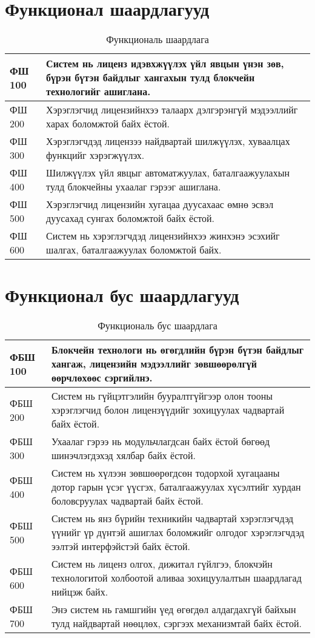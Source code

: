 \section{Функционал шаардлагууд}
\begin{table}[h!]
	\centering
	\begin{tabular}{ |p{2cm}|p{13cm}| }
      \hline
      ФШ 100 & Систем нь лиценз идэвхжүүлэх үйл явцын үнэн зөв, бүрэн бүтэн байдлыг хангахын тулд блокчейн технологийг ашиглана.
      \\ \hline
      ФШ 200 & Хэрэглэгчид  лицензийнхээ талаарх дэлгэрэнгүй мэдээллийг харах боломжтой байх ёстой.
      \\ \hline
      ФШ 300 & Хэрэглэгчдэд лицензээ найдвартай шилжүүлэх, хуваалцах функцийг хэрэгжүүлэх.
      \\ \hline
      ФШ 400 & Шилжүүлэх үйл явцыг автоматжуулах, баталгаажуулахын тулд блокчейны ухаалаг гэрээг ашиглана.
      \\ \hline
      ФШ 500 & Хэрэглэгчид лицензийн хугацаа дуусахаас өмнө эсвэл дуусахад сунгах боломжтой байх ёстой.
      \\ \hline
      ФШ 600 & Систем нь хэрэглэгчдэд лицензийнхээ жинхэнэ эсэхийг шалгах, баталгаажуулах боломжтой байх.
      \\ \hline
	\end{tabular}
   \caption{Функциональ шаардлага}
\end{table}

\newpage
\section{Функционал бус шаардлагууд}
\begin{table}[h!]
	\centering
	\begin{tabular}{ |p{2cm}|p{13cm}| }
		\hline
		ФБШ 100 & Блокчейн технологи нь өгөгдлийн бүрэн бүтэн байдлыг хангаж, лицензийн мэдээллийг зөвшөөрөлгүй өөрчлөхөөс сэргийлнэ.
      \\ \hline
		ФБШ 200 & Систем нь гүйцэтгэлийн бууралтгүйгээр олон тооны хэрэглэгчид болон лицензүүдийг зохицуулах чадвартай байх ёстой.
      \\ \hline
		ФБШ 300 & Ухаалаг гэрээ нь модульчлагдсан байх ёстой бөгөөд шинэчлэгдэхэд хялбар байх ёстой.
      \\ \hline
		ФБШ 400 & Систем нь хүлээн зөвшөөрөгдсөн тодорхой хугацааны дотор гарын үсэг үүсгэх, баталгаажуулах хүсэлтийг хурдан боловсруулах чадвартай байх ёстой.
      \\ \hline
		ФБШ 500 & Систем нь янз бүрийн техникийн чадвартай хэрэглэгчдэд үүнийг үр дүнтэй ашиглах боломжийг олгодог хэрэглэгчдэд ээлтэй интерфэйстэй байх ёстой.
      \\ \hline
		ФБШ 600 & Систем нь лиценз олгох, дижитал гүйлгээ, блокчэйн технологитой холбоотой аливаа зохицуулалтын шаардлагад нийцэж байх.
      \\  \hline
      ФБШ 700 & Энэ систем нь гамшгийн үед өгөгдөл алдагдахгүй байхын тулд найдвартай нөөцлөх, сэргээх механизмтай байх ёстой.
      \\ \hline
	\end{tabular}
   \caption{Функциональ бус шаардлага}
\end{table}


